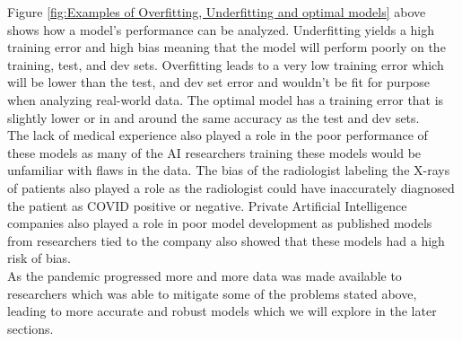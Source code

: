 \vspace{0.5mm}
Figure \ref{fig:Examples of Overfitting, Underfitting and optimal models} above shows how a model's performance can be analyzed. Underfitting yields a high training error and high bias meaning that the model will perform poorly on the training, test, and dev sets.  Overfitting leads to a very low training error which will be lower than the test, and dev set error and wouldn't be fit for purpose when analyzing real-world data.   The optimal model has a training error that is slightly lower or in and around the same accuracy as the test and dev sets.
\\
The lack of medical experience also played a role in the poor performance of these models as many of the AI researchers training these models would be unfamiliar with flaws in the data.  The bias of the radiologist labeling the X-rays of patients also played a role as the radiologist could have inaccurately diagnosed the patient as COVID positive or negative.  Private Artificial Intelligence companies also played a role in poor model development as published models from researchers tied to the company also showed that these models had a high risk of bias.\cite{mitTechReviewCovid19}
\\
As the pandemic progressed more and more data was made available to researchers which was able to mitigate some of the problems stated above, leading to more accurate and robust models which we will explore in the later sections.

